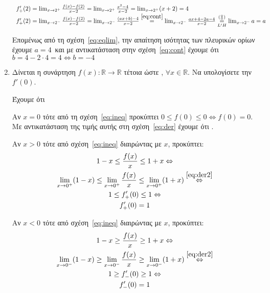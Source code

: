 \begin{enumerate}
		\[
			\begin{tabular}{l}
			$f_{+}'(2) = \lim_{x\to 2^{+}} \frac{f(x) - f(2)}{x - 2} =
			\lim_{x\to 2^{+}} \frac{x^{2} - 4}{x - 2} = \lim_{x\to 2^{+}} (x+2)
			= 4$ \\
			$f_{+}'(2) = \lim_{x\to 2^{-}} \frac{f(x)- f(2)}{x-2} = \lim_{x\to
			2^{-}} \frac{(ax+b) - 4}{x - 2}\overset{\eqref{eq:cont}}{=} \lim_{x\to 2^{-}}
				\frac{ax+4 - 2a - 4}{x - 2}
				\overset{(\frac{0}{0})}{\underset{L'H}{=}} \lim_{x\to 2^{-}} a = a$
			\end{tabular}
		\]
		
		Επομένως από τη σχέση~\eqref{eq:eqlim}, την απαίτηση ισότητας των
		πλευρικών ορίων έχουμε $ a = 4 $ και με αντικατάσταση στην
		σχέση~\eqref{eq:cont} έχουμε ότι $ b = 4 - 2\cdot 4 = 4 \Leftrightarrow
		b = -4$ 




	\item Δίνεται η συνάρτηση $ f(x) \colon \mathbb{R} \to \mathbb{R} $ τέτοια
		ώστε , 
		$ \forall x \in \mathbb{R} $. Να υπολογίσετε την $ f'(0) $.


		
		Έχουμε ότι  

		Αν $ x=0 $ τότε από τη σχέση~\eqref{eq:ineq} προκύπτει $ 0 \leq f(0) \leq 0
		\Leftrightarrow f(0) = 0$. Με αντικατάσταση της τιμής αυτής στη
		σχέση~\eqref{eq:der} έχουμε ότι .
		
		\begin{minipage}{0.45\textwidth}
		Αν $ x>0 $ τότε από σχέση~\eqref{eq:ineq} διαιρώντας με $x$, προκύπτει:
		\begin{gather*}
			1-x \leq \frac{f(x)}{x} \leq 1+x \Leftrightarrow \\ 
			\lim_{x\to 0^{+}}(1-x) \leq \lim_{x\to 0^{+}} \frac{f(x)}{x}
			\leq \lim_{x\to 0^{+}} (1+x)\overset{\eqref{eq:der2}}\Leftrightarrow
			\\
			1 \leq f_{+}'(0) \leq 1 \Leftrightarrow \\
			f_{+}'(0) = 1
		\end{gather*}
		\end{minipage} \hfill 
		\begin{minipage}{0.45\textwidth}
		Αν $ x<0 $ τότε από σχέση~\eqref{eq:ineq} διαιρώντας με $x$, προκύπτει:
			\begin{gather*}
			1-x \geq \frac{f(x)}{x} \geq 1+x \Leftrightarrow \\ 
			\lim_{x\to 0^{-}}(1-x) \geq \lim_{x\to 0^{-}} \frac{f(x)}{x}
			\geq \lim_{x\to 0^{-}} (1+x)\overset{\eqref{eq:der2}}\Leftrightarrow
			\\
			1 \geq f_{-}'(0) \geq 1 \Leftrightarrow \\
			f_{-}'(0) = 1
			\end{gather*}
		\end{minipage} 


\end{enumerate}
